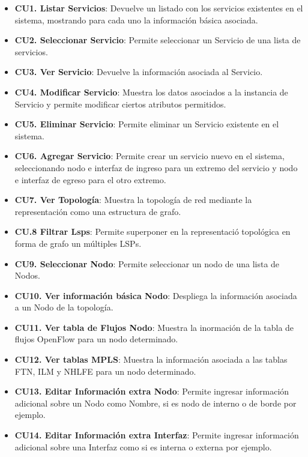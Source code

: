 \begin{itemize}
\item \textbf{CU1. Listar Servicios}: Devuelve un listado con los servicios existentes en el sistema, mostrando para cada uno la informaci\'on b\'asica asociada.

\item \textbf{CU2. Seleccionar Servicio}: Permite seleccionar un Servicio de una lista de servicios.

\item \textbf{CU3. Ver Servicio}: Devuelve la informaci\'on asociada al Servicio.

\item \textbf{CU4. Modificar Servicio}: Muestra los datos asociados a la instancia de Servicio y permite modificar ciertos atributos permitidos.
 								
\item \textbf{CU5. Eliminar Servicio}: Permite eliminar un Servicio existente en el sistema.

\item \textbf{CU6. Agregar Servicio}: Permite crear un servicio nuevo en el sistema, seleccionando nodo e interfaz de ingreso para un extremo del servicio y nodo e interfaz de egreso para el otro extremo. 

\item \textbf{CU7. Ver Topolog\'ia}: Muestra la topolog\'ia de red mediante la representaci\'on como una estructura de grafo.

\item \textbf{CU.8 Filtrar Lsps}: Permite superponer en la representaci\'o topol\'ogica en forma de grafo un múltiples LSPs.

\item \textbf{CU9. Seleccionar Nodo}: Permite seleccionar un nodo de una lista de Nodos.

\item \textbf{CU10. Ver informaci\'on b\'asica Nodo}: Despliega la informaci\'on asociada a un Nodo de la topolog\'ia.

\item \textbf{CU11. Ver tabla de Flujos Nodo}: Muestra la inormaci\'on de la tabla de flujos OpenFlow para un nodo determinado.

\item \textbf{CU12. Ver tablas MPLS}: Muestra la informaci\'on asociada a las tablas FTN, ILM y NHLFE para un nodo determinado.

\item \textbf{CU13. Editar Informaci\'on extra Nodo}: Permite ingresar informaci\'on adicional sobre un Nodo como Nombre, si es nodo de interno o de borde por ejemplo.

\item \textbf{CU14. Editar Informaci\'on extra Interfaz}: Permite ingresar informaci\'on adicional sobre una Interfaz como si es interna o externa por ejemplo.
\end{itemize}


